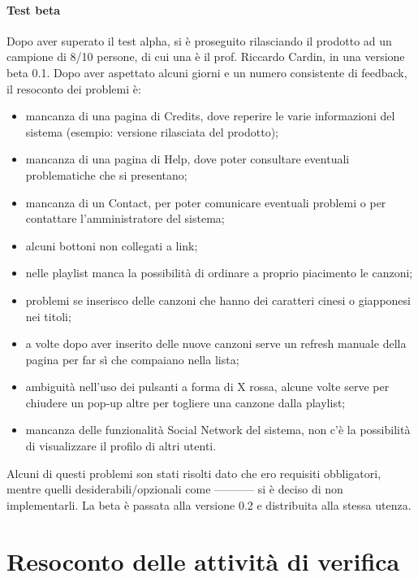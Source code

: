 \subsubsection{Test beta}
Dopo aver superato il test alpha, si \`e proseguito rilasciando il prodotto ad
un campione di 8/10 persone, di cui una \`e il prof. Riccardo Cardin, in una
versione beta 0.1. Dopo aver aspettato alcuni giorni e un numero consistente di
feedback, il resoconto dei problemi \`e:
\begin{itemize}
  \item mancanza di una pagina di Credits, dove reperire le varie informazioni
  del sistema (esempio: versione rilasciata del prodotto); 
  \item mancanza di una pagina di Help, dove poter consultare eventuali
  problematiche che si presentano;
  \item mancanza di un Contact, per poter comunicare eventuali problemi o
  per contattare l'amministratore del sistema;
  \item alcuni bottoni non collegati a link;
  \item nelle playlist manca la possibilit\`a di ordinare a proprio piacimento
  le canzoni;
  \item problemi se inserisco delle canzoni che hanno dei caratteri cinesi o
  giapponesi nei titoli;
  \item a volte dopo aver inserito delle nuove canzoni serve un refresh manuale
  della pagina per far s\`i che compaiano nella lista;
  \item ambiguit\`a nell'uso dei pulsanti a forma di X rossa, alcune volte serve
  per chiudere un pop-up altre per togliere una canzone dalla playlist;
  \item mancanza delle funzionalit\`a Social Network del sistema, non c'\`e la
  possibilit\`a di visualizzare il profilo di altri utenti.
\end{itemize}
Alcuni di questi problemi son stati risolti dato che ero requisiti obbligatori,
mentre quelli desiderabili/opzionali come ----------- si \`e deciso di non
implementarli.
La beta \`e passata alla versione 0.2 e distribuita alla stessa utenza.



\listoftables
{}
\listoffigures
{}



\appendix


\chapter{Resoconto delle attivit\`a di verifica}
\thispagestyle{fancy} %

